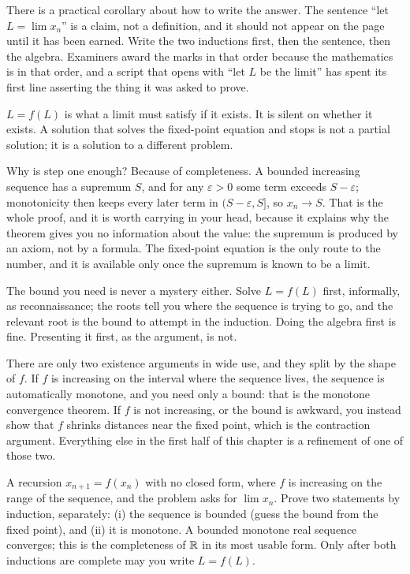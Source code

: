 There is a practical corollary about how to write the answer. The sentence ``let $L=\lim x_n$'' is a claim, not a definition, and it should not appear on the page until it has been earned. Write the two inductions first, then the sentence, then the algebra. Examiners award the marks in that order because the mathematics is in that order, and a script that opens with ``let $L$ be the limit'' has spent its first line asserting the thing it was asked to prove.

\begin{keynote}
$L=f(L)$ is what a limit must satisfy if it exists. It is silent on whether it exists. A solution that solves the fixed-point equation and stops is not a partial solution; it is a solution to a different problem.
\end{keynote}

Why is step one enough? Because of completeness. A bounded increasing sequence has a supremum $S$, and for any $\varepsilon>0$ some term exceeds $S-\varepsilon$; monotonicity then keeps every later term in $(S-\varepsilon,S]$, so $x_n\to S$. That is the whole proof, and it is worth carrying in your head, because it explains why the theorem gives you no information about the value: the supremum is produced by an axiom, not by a formula. The fixed-point equation is the only route to the number, and it is available only once the supremum is known to be a limit.

The bound you need is never a mystery either. Solve $L=f(L)$ first, informally, as reconnaissance; the roots tell you where the sequence is trying to go, and the relevant root is the bound to attempt in the induction. Doing the algebra first is fine. Presenting it first, as the argument, is not.

There are only two existence arguments in wide use, and they split by the shape of $f$. If $f$ is increasing on the interval where the sequence lives, the sequence is automatically monotone, and you need only a bound: that is the monotone convergence theorem. If $f$ is not increasing, or the bound is awkward, you instead show that $f$ shrinks distances near the fixed point, which is the contraction argument. Everything else in the first half of this chapter is a refinement of one of those two.

\cue A recursion $x_{n+1}=f(x_n)$ with no closed form, where $f$ is increasing on the range of the sequence, and the problem asks for $\lim x_n$.
\method Prove two statements by induction, separately: (i) the sequence is bounded (guess the bound from the fixed point), and (ii) it is monotone. A bounded monotone real sequence converges; this is the completeness of $\mathbb{R}$ in its most usable form. Only after both inductions are complete may you write $L=f(L)$.

